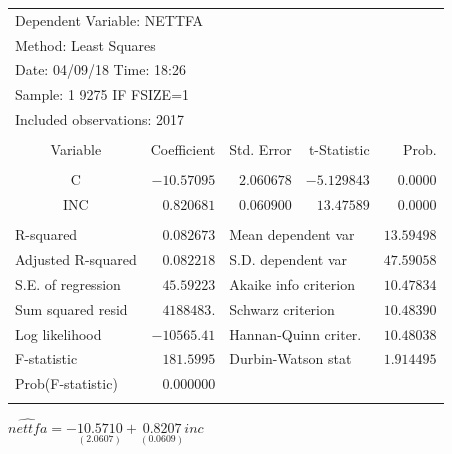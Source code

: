 \documentclass[12pt]{report}
\begin{document}
\begin{table}[H]
	\centering
	\begin{tabular}{lrrrr}
		\multicolumn{3}{l}{Dependent Variable: NETTFA}&\multicolumn{1}{c}{}&\multicolumn{1}{c}{}\\
		\multicolumn{3}{l}{Method: Least Squares}&\multicolumn{1}{c}{}&\multicolumn{1}{c}{}\\
		\multicolumn{3}{l}{Date: 04/09/18   Time: 18:26}&\multicolumn{1}{c}{}&\multicolumn{1}{c}{}\\
		\multicolumn{3}{l}{Sample: 1 9275 IF FSIZE=1}&\multicolumn{1}{c}{}&\multicolumn{1}{c}{}\\
		\multicolumn{3}{l}{Included observations: 2017}&\multicolumn{1}{c}{}&\multicolumn{1}{c}{}\\
		[4.5pt] \hline \\ [-4.5pt]
		\multicolumn{1}{c}{Variable}&\multicolumn{1}{r}{Coefficient}&\multicolumn{1}{r}{Std. Error}&\multicolumn{1}{r}{t-Statistic}&\multicolumn{1}{r}{Prob.}\\
		[4.5pt] \hline \\ [-4.5pt]
		\multicolumn{1}{c}{C}&\multicolumn{1}{r}{$-10.57095$}&\multicolumn{1}{r}{$2.060678$}&\multicolumn{1}{r}{$-5.129843$}&\multicolumn{1}{r}{$0.0000$}\\
		\multicolumn{1}{c}{INC}&\multicolumn{1}{r}{$0.820681$}&\multicolumn{1}{r}{$0.060900$}&\multicolumn{1}{r}{$13.47589$}&\multicolumn{1}{r}{$0.0000$}\\
		[4.5pt] \hline \\ [-4.5pt]
		\multicolumn{1}{l}{R-squared}&\multicolumn{1}{r}{$0.082673$}&\multicolumn{2}{l}{Mean dependent var}&\multicolumn{1}{r}{$13.59498$}\\
		\multicolumn{1}{l}{Adjusted R-squared}&\multicolumn{1}{r}{$0.082218$}&\multicolumn{2}{l}{S.D. dependent var}&\multicolumn{1}{r}{$47.59058$}\\
		\multicolumn{1}{l}{S.E. of regression}&\multicolumn{1}{r}{$45.59223$}&\multicolumn{2}{l}{Akaike info criterion}&\multicolumn{1}{r}{$10.47834$}\\
		\multicolumn{1}{l}{Sum squared resid}&\multicolumn{1}{r}{$4188483.$}&\multicolumn{2}{l}{Schwarz criterion}&\multicolumn{1}{r}{$10.48390$}\\
		\multicolumn{1}{l}{Log likelihood}&\multicolumn{1}{r}{$-10565.41$}&\multicolumn{2}{l}{Hannan-Quinn criter.}&\multicolumn{1}{r}{$10.48038$}\\
		\multicolumn{1}{l}{F-statistic}&\multicolumn{1}{r}{$181.5995$}&\multicolumn{2}{l}{Durbin-Watson stat}&\multicolumn{1}{r}{$1.914495$}\\
		\multicolumn{1}{l}{Prob(F-statistic)}&\multicolumn{1}{r}{$0.000000$}&\multicolumn{1}{c}{}&\multicolumn{1}{c}{}&\multicolumn{1}{c}{}\\
		[4.5pt] \hline \\ [-4.5pt]
	\end{tabular}
\end{table}
\vspace{-\baselineskip} \centering $\widehat{nettfa} = -\underset{(2.0607)}{10.5710} + \underset{(0.0609)}{0.8207}inc$
\end{document}
